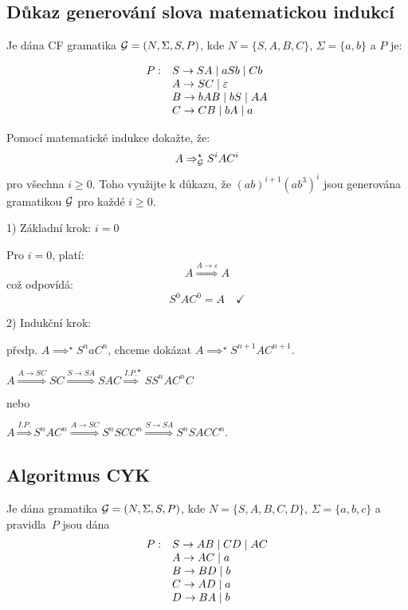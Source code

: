 \subsection{Důkaz generování slova matematickou indukcí} %
Je dána CF gramatika $\mathcal{G} = (N, \Sigma, S, P)$, kde $N = \{S, A, B, C\}$, $\Sigma = \{a, b\}$ a $P$ je:

\[
\begin{array}{l l}
    P: & S \rightarrow SA \mid aSb \mid Cb \\
       & A \rightarrow SC \mid \varepsilon \\
       & B \rightarrow bAB \mid bS \mid AA \\
       & C \rightarrow CB \mid bA \mid a \\
\end{array}
\]

Pomocí matematické indukce dokažte, že:
\[
A \Rightarrow_{\mathcal{G}}^{\star} S^i A C^i
\]
pro všechna $i \geq 0$. Toho využijte k důkazu, že $(ab)^{i+1}(ab^3)^i$ jsou generována gramatikou $\mathcal{G}$ pro 
každé $i \geq 0$.

1) Základní krok: $i = 0$

Pro $i = 0$, platí:
\[
A \stackrel{A \rightarrow \varepsilon}{\Longrightarrow} A
\]
což odpovídá:
\[
S^0 A C^0 = A \quad \checkmark
\]

2) Indukční krok:

předp. $A \implies^{\star} S^n a C^n$, chceme dokázat $A \implies^{\star} S^{n+1} A C^{n+1}$.

$A \stackrel{A \rightarrow SC}{\Longrightarrow} SC \stackrel{S \rightarrow SA}{\Longrightarrow} SAC \stackrel{I.P.}
{\Longrightarrow}^{\star} SS^nAC^nC$

nebo

$A \stackrel{I.P.}{\Longrightarrow} S^n A C^n \stackrel{A \rightarrow SC}{\Longrightarrow} S^nSCC^n \stackrel
{S \rightarrow SA}{\Longrightarrow} S^nSACC^n$.



\subsection{Algoritmus CYK} %
Je dána gramatika $\mathcal{G} = (N, \Sigma, S, P )$, kde $N = \{S, A, B, C, D\}$, $\Sigma = \{a, b, c\}$ a
pravidla~$P$ jsou dána
\[
\begin{array}{l l}
    P: & S \rightarrow AB \mid CD \mid AC\\
    & A \rightarrow AC \mid a \\
    & B \rightarrow BD \mid b \\
    & C \rightarrow AD \mid a \\
    & D \rightarrow BA \mid b \\ 
\end{array}
\]

